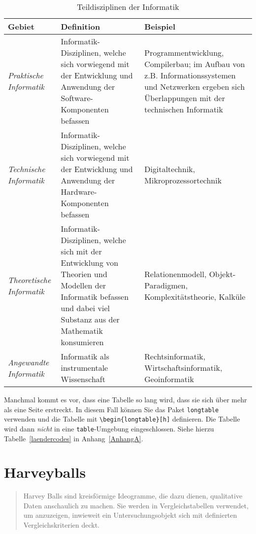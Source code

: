 \begin{table}[h]
  \caption{Teildisziplinen der Informatik}
  \label{Kap2:Teildisziplinen}
  \renewcommand{\arraystretch}{1.2}
  \centering
  \sffamily
  \begin{footnotesize}
    \begin{tabularx}{0.9\textwidth}{l X L}
      \toprule
      \textbf{Gebiet} & \textbf{Definition} & \textbf{Beispiel}\\
      \midrule
      \emph{Praktische Informatik} & Informatik-Disziplinen, welche sich vorwiegend mit der Entwicklung und Anwendung der Software-Komponenten befassen & Programmentwicklung, Compilerbau; im Aufbau von z.B. Informationssystemen und Netzwerken ergeben sich Überlappungen mit der technischen Informatik \\
      \emph{Technische Informatik} & Informatik-Disziplinen, welche sich vorwiegend mit der Entwicklung und Anwendung der Hardware-Komponenten befassen & Digitaltechnik, Mikroprozessortechnik \\
      \emph{Theoretische Informatik} & Informatik-Disziplinen, welche sich mit der Entwicklung von Theorien und Modellen der Informatik befassen und dabei viel Substanz aus der Mathematik konsumieren & Relationenmodell, Objekt-Paradigmen, Komplexitätstheorie, Kalküle \\
      \emph{Angewandte Informatik} & Informatik als instrumentale Wissenschaft & Rechtsinformatik, Wirtschaftsinformatik, Geoinformatik \\
      \bottomrule
    \end{tabularx}
  \end{footnotesize}
  \rmfamily
\end{table}

Manchmal kommt es vor, dass eine Tabelle so lang wird, dass sie sich über mehr als eine Seite erstreckt. In diesem Fall können Sie das Paket \texttt{longtable} verwenden und die Tabelle mit \verb+\begin{longtable}[h]+ definieren. Die Tabelle wird dann \textit{nicht} in eine \texttt{table}-Umgebung eingeschlossen. Siehe hierzu Tabelle~\ref{laendercodes} in Anhang~\ref{AnhangA}.


\section{Harveyballs}

\begin{quote}
    Harvey Balls sind kreisförmige Ideogramme, die dazu dienen, qualitative Daten anschaulich zu machen. Sie werden in Vergleichstabellen verwendet, um anzuzeigen, inwieweit ein Untersuchungsobjekt sich mit definierten Vergleichskriterien deckt. \parencite{Wikipedia_HarveyBalls}
\end{quote}

